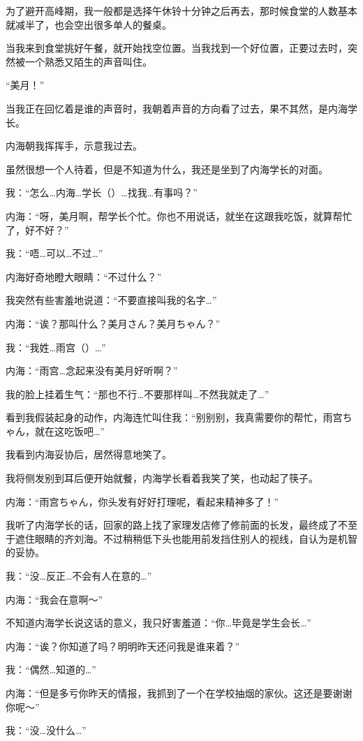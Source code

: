 \cutlinef\food

为了避开高峰期，我一般都是选择午休铃十分钟之后再去，那时候食堂的人数基本就减半了，也会空出很多单人的餐桌。

当我来到食堂挑好午餐，就开始找空位置。当我找到一个好位置，正要过去时，突然被一个熟悉又陌生的声音叫住。

“美月！”

当我正在回忆着是谁的声音时，我朝着声音的方向看了过去，果不其然，是内海学长。

内海朝我挥挥手，示意我过去。

虽然很想一个人待着，但是不知道为什么，我还是坐到了内海学长的对面。

我：“怎么…内海…学长（）…找我…有事吗？”

内海：“呀，美月啊，帮学长个忙。你也不用说话，就坐在这跟我吃饭，就算帮忙了，好不好？”

我：“唔…可以…不过…”

内海好奇地瞪大眼睛：“不过什么？”

我突然有些害羞地说道：“不要直接叫我的名字…”

内海：“诶？那叫什么？美月さん？美月ちゃん？”

我：“我姓…雨宫（）…”

内海：“雨宫…念起来没有美月好听啊？”

我的脸上挂着生气：“那也不行…不要那样叫…不然我就走了…”

看到我假装起身的动作，内海连忙叫住我：“别别别，我真需要你的帮忙，雨宫ちゃん，就在这吃饭吧…”

我看到内海妥协后，居然得意地笑了。

我将侧发别到耳后便开始就餐，内海学长看着我笑了笑，也动起了筷子。

内海：“雨宫ちゃん，你头发有好好打理呢，看起来精神多了！”

我听了内海学长的话，回家的路上找了家理发店修了修前面的长发，最终成了不至于遮住眼睛的齐刘海。不过稍稍低下头也能用前发挡住别人的视线，自认为是机智的妥协。

我：“没…反正…不会有人在意的…”

内海：“我会在意啊～”

不知道内海学长说这话的意义，我只好害羞道：“你…毕竟是学生会长…”

内海：“诶？你知道了吗？明明昨天还问我是谁来着？”

我：“偶然…知道的…”

内海：“但是多亏你昨天的情报，我抓到了一个在学校抽烟的家伙。这还是要谢谢你呢～”

我：“没…没什么…”

